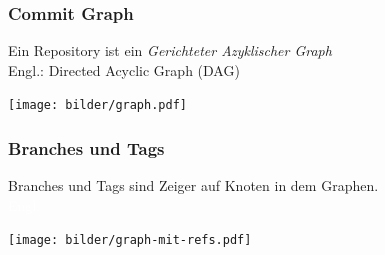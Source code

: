 \documentclass{beamer}
\begin{document}
\begin{frame}
 \frametitle{Commit Graph}
  


Ein Repository ist ein \emph{Gerichteter Azyklischer Graph}\\
Engl.: Directed Acyclic Graph (DAG)

\begin{center}
\texttt{[image: bilder/graph.pdf]}
\end{center}

  
 \end{frame}
\begin{frame}
 \frametitle{Branches und Tags}
  


Branches und Tags sind Zeiger auf Knoten in dem Graphen.\\
\textcolor{white}{Engl.}

\begin{center}
\texttt{[image: bilder/graph-mit-refs.pdf]}
\end{center}

  
 \end{frame}
\end{document}
